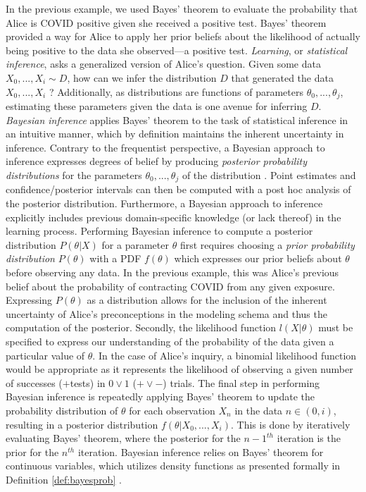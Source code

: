 \documentclass[
  12pt,
  twoside]{book}
\theoremstyle{definition}
\theoremstyle{definition}
\theoremstyle{definition}
\theoremstyle{remark}
\begin{document}
In the previous example, we used Bayes' theorem to evaluate the probability that Alice is COVID positive given she received a positive test.
Bayes' theorem provided a way for Alice to apply her prior beliefs about the likelihood of actually being positive to the data she observed---a positive test.
\emph{Learning}, or \emph{statistical inference}, asks a generalized version of Alice's question.
Given some data \(X_0,...,X_i \sim D\), how can we infer the distribution \(D\) that generated the data \(X_0,...,X_i\) \citep[  6.1]{Wasserman2004}?
Additionally, as distributions are functions of parameters \(\theta_0, ..., \theta_j\), estimating these parameters given the data is one avenue for inferring \(D\).
\emph{Bayesian inference} applies Bayes' theorem to the task of statistical inference in an intuitive manner, which by definition maintains the inherent uncertainty in inference.
Contrary to the frequentist perspective, a Bayesian approach to inference expresses degrees of belief by producing \emph{posterior probability distributions} for the parameters \(\theta_0, ..., \theta_j\) of the distribution \citep[  11.1]{Wasserman2004}.
Point estimates and confidence/posterior intervals can then be computed with a post hoc analysis of the posterior distribution.
Furthermore, a Bayesian approach to inference explicitly includes previous domain-specific knowledge (or lack thereof) in the learning process.
Performing Bayesian inference to compute a posterior distribution \(P(\theta|X)\) for a parameter \(\theta\) first requires choosing a \emph{prior probability distribution} \(P(\theta)\) with a PDF \(f(\theta)\) which expresses our prior beliefs about \(\theta\) before observing any data.
In the previous example, this was Alice's previous belief about the probability of contracting COVID from any given exposure.
Expressing \(P(\theta)\) as a distribution allows for the inclusion of the inherent uncertainty of Alice's preconceptions in the modeling schema and thus the computation of the posterior.
Secondly, the likelihood function \(l(X|\theta)\) must be specified to express our understanding of the probability of the data given a particular value of \(\theta\).
In the case of Alice's inquiry, a binomial likelihood function would be appropriate as it represents the likelihood of observing a given number of successes (\(+\)tests) in \(0 \lor 1\) (\(+ \lor -\)) trials.
The final step in performing Bayesian inference is repeatedly applying Bayes' theorem to update the probability distribution of \(\theta\) for each observation \(X_n\) in the data \(n \in (0,i)\), resulting in a posterior distribution \(f(\theta|X_0,...,X_i)\).
This is done by iteratively evaluating Bayes' theorem, where the posterior for the \(n-1^{th}\) iteration is the prior for the \(n^{th}\) iteration.
Bayesian inference relies on Bayes' theorem for continuous variables, which utilizes density functions as presented formally in Definition \ref{def:bayesprob} \citep{Junker2003}.
\end{document}
